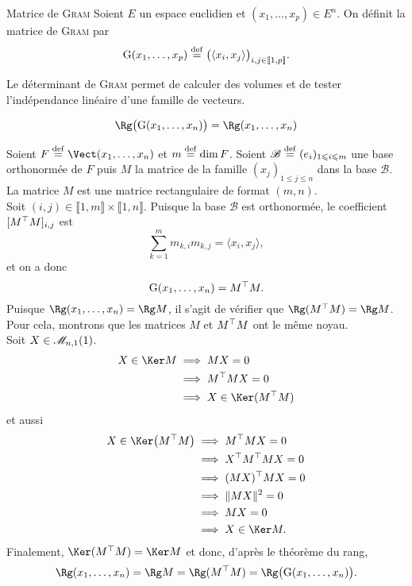 \begin{defi}{Matrice de \textsc{Gram}}
    Soient $E$ un espace euclidien et $(x_1, \dots, x_p) \in E^n$. On définit la matrice de \textsc{Gram} par
    $$\mathrm{G}(x_1, \dots, x_p) \overset{\mathrm{\tiny def}}{=} \big( \langle x_i, x_j \rangle \big)_{i,j \in \llbracket 1, p \rrbracket}.$$
\end{defi}
Le déterminant de \textsc{Gram} permet de calculer des volumes et de tester l'indépendance linéaire d'une famille de vecteurs.
\begin{prop}{}
    $$\Rg \big( \Gram(x_1, \dots, x_n) \big) = \Rg(x_1, \dots, x_n)$$
\end{prop}

\begin{preuve}
    Soient $F \defeq \Vect(x_1, \dots, x_n)$ et $m \overset{\mathrm{\tiny def}}{=} \dim F$. Soient $\mathscr{B} \overset{\mathrm{\tiny def}}{=} (e_i)_{1 \leqslant i \leqslant m}$ une base orthonormée de $F$ puis $M$ la matrice de la famille $(x_j)_{1 \leqslant j \leqslant n}$ dans la base $\mathscr{B}$. La matrice $M$ est une matrice rectangulaire de format $(m, n)$. \\
    Soit $(i, j) \in \llbracket 1, m \rrbracket \times \llbracket 1, n \rrbracket$. Puisque la base $\mathscr{B}$ est orthonormée, le coefficient $[ M^\top M ]_{i,j}$ est 
    $$\sum_{k=1}^m m_{k,i} m_{k,j} = \langle x_i, x_j \rangle,$$
    et on a donc
    $$\mathrm{G}(x_1, \dots, x_n) = M^\top M.$$
    Puisque $\Rg(x_1, \dots, x_n) = \Rg M$, il s'agit de vérifier que $\Rg(\Trsp{M} M) = \Rg M$. Pour cela, montrons que les matrices $M$ et $M^\top M$ ont le même noyau. \\
    Soit $X \in \mathscr{M}_{n,1}(1)$.
    \begin{align*}
        X \in \Ker M &\implies MX = 0 \\
        &\implies \Trsp{M}MX = 0 \\
        &\implies X \in \Ker(\Trsp{M}M)
    \end{align*}
    et aussi
    \begin{align*}
        X \in \Ker \big( \Trsp{M}M \big) &\implies \Trsp{M}MX = 0 \\
        &\implies \Trsp{X}\Trsp{M}MX = 0 \\
        &\implies \Trsp{(MX)}MX = 0 \\
        &\implies \norme{MX}^2 = 0 \\
        &\implies MX = 0 \\
        &\implies X \in \Ker M.
    \end{align*}
    Finalement, $\Ker(\Trsp{M}M) = \Ker M$ et donc, d'après le théorème du rang,
    $$\Rg(x_1, \dots, x_n) = \Rg M = \Rg(\Trsp{M}M) = \Rg \big( \Gram(x_1, \dots, x_n) \big).$$
\end{preuve}

